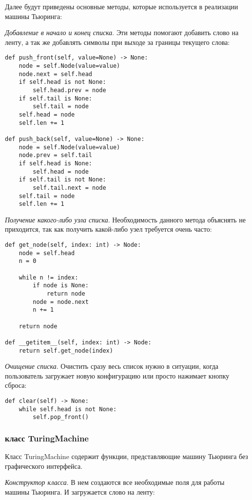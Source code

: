 Далее будут приведены основные методы, которые используется в реализации машины Тьюринга:

\textit{Добавление в начало и конец списка}. Эти методы помогают добавить слово на ленту, а так же добавлять символы при выходе за границы текущего слова:

\begin{lstlisting}
def push_front(self, value=None) -> None:
    node = self.Node(value=value)
    node.next = self.head
    if self.head is not None:
        self.head.prev = node
    if self.tail is None:
        self.tail = node
    self.head = node
    self.len += 1

def push_back(self, value=None) -> None:
    node = self.Node(value=value)
    node.prev = self.tail
    if self.head is None:
        self.head = node
    if self.tail is not None:
        self.tail.next = node
    self.tail = node
    self.len += 1
\end{lstlisting}


\textit{Получение какого-либо узла списка}. Необходимость данного метода объяснять не приходится, так как получить какой-либо узел требуется очень часто:

\begin{lstlisting}
def get_node(self, index: int) -> Node:
    node = self.head
    n = 0

    while n != index:
        if node is None:
            return node
        node = node.next
        n += 1

    return node

def __getitem__(self, index: int) -> Node:
    return self.get_node(index)
\end{lstlisting}


\textit{Очищение списка}. Очистить сразу весь список нужно в ситуации, когда пользователь загружает новую конфигурацию или просто нажимает кнопку сброса:

\begin{lstlisting}
def clear(self) -> None:
    while self.head is not None:
        self.pop_front()
\end{lstlisting}


\subsubsection{класс TuringMachine}

Класс TuringMachine содержит функции, представляющие машину Тьюринга без графического интерфейса.

\textit{Конструктор класса}. В нем создаются все необходимые поля для работы машины Тьюринга. И загружается слово на ленту:

